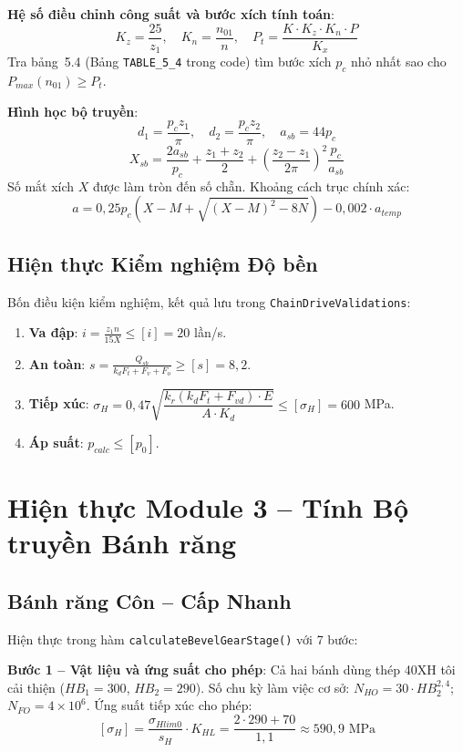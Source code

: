 \textbf{Hệ số điều chỉnh công suất và bước xích tính toán}:
\[
  K_z = \frac{25}{z_1}, \quad
  K_n = \frac{n_{01}}{n}, \quad
  P_t = \frac{K \cdot K_z \cdot K_n \cdot P}{K_x}
\]
Tra bảng~5.4 (Bảng \texttt{TABLE\_5\_4} trong code)
tìm bước xích $p_c$ nhỏ nhất sao cho $P_{max}(n_{01}) \geq P_t$.

\textbf{Hình học bộ truyền}:
\[
  d_1 = \frac{p_c z_1}{\pi}, \quad
  d_2 = \frac{p_c z_2}{\pi}, \quad
  a_{sb} = 44 p_c
\]
\[
  X_{sb} = \frac{2a_{sb}}{p_c} + \frac{z_1+z_2}{2}
           + \left(\frac{z_2-z_1}{2\pi}\right)^2 \frac{p_c}{a_{sb}}
\]
Số mắt xích $X$ được làm tròn đến số chẵn.
Khoảng cách trục chính xác:
\[
  a = 0{,}25 p_c \left(X - M + \sqrt{(X-M)^2 - 8N}\right) - 0{,}002 \cdot a_{temp}
\]

\subsection{Hiện thực Kiểm nghiệm Độ bền}

Bốn điều kiện kiểm nghiệm, kết quả lưu trong \texttt{ChainDriveValidations}:

\begin{enumerate}
  \item \textbf{Va đập}: $i = \frac{z_1 n}{15X} \leq [i] = 20$ lần/s.
  \item \textbf{An toàn}: $s = \frac{Q_{sb}}{k_d F_t + F_v + F_o} \geq [s] = 8{,}2$.
  \item \textbf{Tiếp xúc}:
        $\sigma_H = 0{,}47\sqrt{\dfrac{k_r(k_d F_t + F_{vd}) \cdot E}{A \cdot K_d}}
         \leq [\sigma_H] = 600$ MPa.
  \item \textbf{Áp suất}: $p_{calc} \leq [p_0]$.
\end{enumerate}

\section{Hiện thực Module 3 -- Tính Bộ truyền Bánh răng}
\label{sec:impl-m3}

\subsection{Bánh răng Côn -- Cấp Nhanh}

Hiện thực trong hàm \texttt{calculateBevelGearStage()} với 7 bước:

\textbf{Bước 1 -- Vật liệu và ứng suất cho phép}:
Cả hai bánh dùng thép 40XH tôi cải thiện ($HB_1 = 300$, $HB_2 = 290$).
Số chu kỳ làm việc cơ sở:
$N_{HO} = 30 \cdot HB_2^{2{,}4}$; $N_{FO} = 4 \times 10^6$.
Ứng suất tiếp xúc cho phép:
\[
  [\sigma_H] = \frac{\sigma_{Hlim0}}{s_H} \cdot K_{HL}
             = \frac{2 \cdot 290 + 70}{1{,}1} \approx 590{,}9 \text{ MPa}
\]


